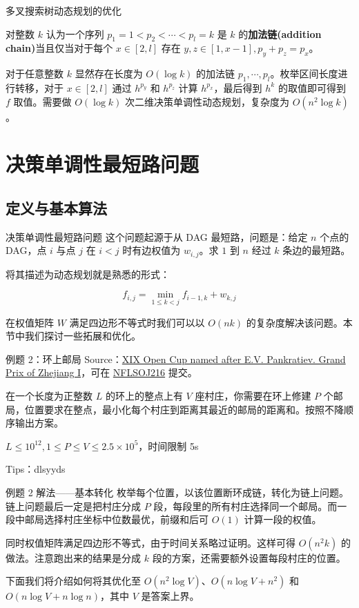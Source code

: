 \documentclass{beamer}
\begin{document}
\begin{frame}{多叉搜索树动态规划的优化}
	\begin{definition}[加法链]
		对整数 $k$ 认为一个序列 $p_1=1 < p_2<\cdots<p_l=k$ 是 $k$ 的\textbf{加法链(addition chain)}当且仅当对于每个 $x\in[2,l]$ 存在 $y,z \in [1,x-1],p_y+p_z=p_x$。
	\end{definition}
	对于任意整数 $k$ 显然存在长度为 $O(\log k)$ 的加法链 $p_1,\cdots,p_l$。枚举区间长度进行转移，对于 $x \in [2,l]$ 通过 $h^{p_y}$ 和 $h^{p_z}$ 计算 $h^{p_x}$，最后得到 $h^{k}$ 的取值即可得到 $f$ 取值。需要做 $O(\log k)$ 次二维决策单调性动态规划，复杂度为 $O(n^2 \log k)$。
\end{frame}
\section{决策单调性最短路问题}
\subsection{定义与基本算法}
\begin{frame}{决策单调性最短路问题}
	这个问题起源于从 DAG 最短路，问题是：给定 $n$ 个点的 DAG，点 $i$ 与点 $j$ 在 $i<j$ 时有边权值为 $w_{i,j}$。求 $1$ 到 $n$ 经过 $k$ 条边的最短路。
	
	将其描述为动态规划就是熟悉的形式：
	
	$$f_{i,j} = \min_{1 \leq k < j} f_{i-1,k} + w_{k,j}$$
	
	在权值矩阵 $W$ 满足四边形不等式时我们可以以 $O(nk)$ 的复杂度解决该问题。本节中我们探讨一些拓展和优化。
\end{frame}
\begin{frame}{例题 2：环上邮局}
	Source：\href{https://www.acmicpc.net/problem/18446}{XIX Open Cup named after E.V. Pankratiev. Grand Prix of Zhejiang I}，可在 \href{https://acm.nflsoj.com/problem/216}{NFLSOJ216} 提交。
	
	在一个长度为正整数 $L$ 的环上的整点上有 $V$ 座村庄，你需要在环上修建 $P$ 个邮局，位置要求在整点，最小化每个村庄到距离其最近的邮局的距离和。按照不降顺序输出方案。
	
	$L \leq 10^{12}, 1 \leq P \leq V \leq 2.5 \times 10^5$，时间限制 5s
	
	Tips：dlsyyds
\end{frame}
\begin{frame}{例题 2 解法——基本转化}
	枚举每个位置，以该位置断环成链，转化为链上问题。链上问题最后一定是把村庄分成 $P$ 段，每段里的所有村庄选择同一个邮局。而一段中邮局选择村庄坐标中位数最优，前缀和后可 $O(1)$ 计算一段的权值。
	
	同时权值矩阵满足四边形不等式，由于时间关系略过证明。这样可得 $O(n^2k)$ 的做法。注意跑出来的结果是分成 $k$ 段的方案，还需要额外设置每段村庄的位置。
	
	下面我们将介绍如何将其优化至 $O(n^2 \log V)$、$O(n \log V+n^2)$ 和 $O(n \log V + n \log n)$，其中 $V$ 是答案上界。
\end{frame}
\end{document}
